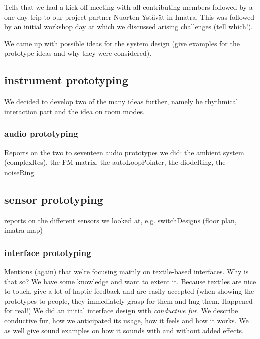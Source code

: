 \documentclass{acm_proc_article-sp}
\begin{document}
Tells that we had a kick-off meeting with all contributing members followed by a one-day trip to our project partner Nuorten Ystävät in Imatra.
This was followed by an initial workshop day at which we discussed arising challenges (tell which!).

We came up with possible ideas for the system design (give examples for the prototype ideas and why they were considered).

\subsection{instrument prototyping} %
\label{sub:instrument_prototyping}

We decided to develop two of the many ideas further, namely he rhythmical interaction part and the idea on room modes.

\subsubsection{audio prototyping} %
\label{ssub:audio_prototyping}

Reports on the two to seventeen audio prototypes we did: 
the ambient system (complexRes), the FM matrix, the autoLoopPointer, the diodeRing, the noiseRing

\subsection{sensor prototyping} %
\label{sub:sensor_prototyping}
reports on the different sensors we looked at, e.g. switchDesigns (floor plan, imatra map)

\subsubsection{interface prototyping} %
\label{ssub:interface_prototyping}

Mentions (again) that we're focusing mainly on textile-based interfaces.
Why is that so? 
	We have some knowledge and want to extent it. 
	Because textiles are nice to touch, give a lot of haptic feedback and are easily accepted (when showing the prototypes to people, they immediately grasp for them and hug them. Happened for real!)
We did an initial interface design with \emph{conductive fur}. 
We describe conductive fur, how we anticipated its usage, how it feels and how it works.
We as well give sound examples on how it sounds with and without added effects.
\end{document}
